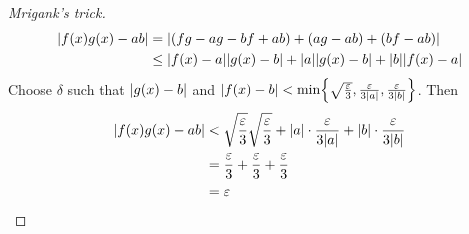 \begin{proof}[Mrigank's trick]
    \begin{align*}
        \abs{ f(x) g(x) - ab } &= \abs{ (fg - ag - bf + ab) + (ag - ab) + (bf - ab) } \\
        &\leq \abs{ f(x) - a } \abs{ g(x) - b } + \abs{ a } \abs{ g(x) - b } + \abs{ b }\abs{ f(x) - a }
    \end{align*}
    Choose $\delta$ such that $\abs{ g(x) - b }$ and $\abs{ f(x) - b } < \min \set{\sqrt{\frac{\varepsilon}{3}}, \frac{\varepsilon}{3\abs{ a}}, \frac{\varepsilon}{3\abs{ b}}}$. Then
    \begin{align*}
        \abs{ f(x) g(x) - ab } &< \sqrt{\frac{\varepsilon}{3}} \sqrt{\frac{\varepsilon}{3}} + \abs{ a } \cdot \frac{\varepsilon}{3\abs{ a}} + \abs{ b} \cdot \frac{\varepsilon}{3 \abs{ b}} \\
        &= \frac{\varepsilon}{3} + \frac{\varepsilon}{3} + \frac{\varepsilon}{3} \\
        &= \varepsilon \qedhere
    \end{align*}
\end{proof}
